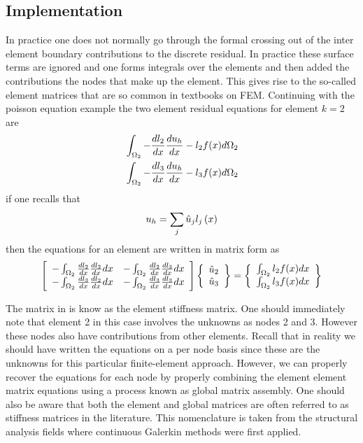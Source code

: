 \subsection{Implementation}
In practice one does not normally go through the formal crossing out of the inter element boundary contributions to the discrete residual.  In practice these surface terms are ignored and one forms integrals over the elements and then added the contributions the nodes that make up the element.  This gives rise to the so-called element matrices that are so common in textbooks on FEM.  Continuing with the poisson equation example the two element residual equations for element $k = 2$ are
\begin{equation}
\begin{split}
& \int_{\Omega_{2} } -\frac{d l_{2}}{d x} \frac{d u_{h}}{d x} - l_{2} f(x) d \Omega_{2} \\
& \int_{\Omega_{2} } -\frac{d l_{3}}{d x} \frac{d u_{h}}{d x} - l_{3} f(x) d \Omega_{2} 
\end{split}
\end{equation}
if one recalls that 
\begin{equation}
 u_{h} = \sum_{j} \hat{u}_{j} l_{j}\left( x \right)
\end{equation}
then the equations for an element are written in matrix form as 
\begin{equation}\label{eq:c2_elem_mat}
\left[
\begin{array}{cc}
-\int_{\Omega_{2}} \frac{d l_{2}}{d x} \frac{d l_{2}}{d x} dx & -\int_{\Omega_{2}} \frac{d l_{2}}{d x} \frac{d l_{3}}{d x} dx \\
-\int_{\Omega_{2}} \frac{d l_{3}}{d x} \frac{d l_{2}}{d x} dx & -\int_{\Omega_{2}} \frac{d l_{3}}{d x} \frac{d l_{3}}{d x} dx
\end{array}
\right]
\left\{
\begin{array}{c}
\hat{u}_{2} \\ 
\hat{u}_{3} 
\end{array}
\right\} = 
\left\{
\begin{array}{c}
\int_{\Omega_{2}} l_{2} f(x) dx \\
\int_{\Omega_{2}} l_{3} f(x) dx 
\end{array}
\right\}
\end{equation}

The matrix in  is know as the element stiffness matrix.  One should immediately note that element 2 in this case involves the unknowns as nodes 2 and 3.  However these nodes also have contributions from other elements.  Recall that in reality we should have written the equations on a per node basis since these are the unknowns for this particular finite-element approach.  However, we can properly recover the equations for each node by properly combining the element element matrix equations using a process known as global matrix assembly.  One should also be aware that both the element and global matrices are often referred to as stiffness matrices in the literature.  This nomenclature is taken from the structural analysis fields where continuous Galerkin methods were first applied.  


